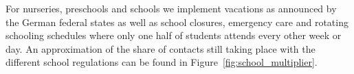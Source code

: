 For nurseries, preschools and schools we implement vacations as announced by the German
federal states as well as school closures, emergency care and rotating schooling
schedules where only one half of students attends every other week or day.
An approximation of the share of contacts still taking place with the different school
regulations can be found in Figure~\ref{fig:school_multiplier}.
